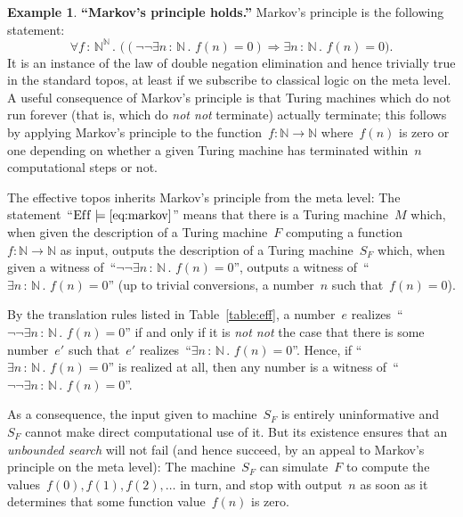 \documentclass[oneside,reqno]{amsart}
\theoremstyle{definition}
\newtheorem{ex}[defn]{Example}
\theoremstyle{plain}
\theoremstyle{remark}
\newcommand{\NN}{\mathbb{N}}
\newcommand{\Eff}{\mathrm{Ef{}f}}
\renewcommand{\_}{\mathpunct{.}\,}
\newcommand{\effective}{ef{}fective\xspace}
\newcommand{\?}{\,{:}\,}
\begin{document}
\begin{ex}\textbf{``Markov's principle holds.''} Markov's principle is the
following statement:
\begin{equation}\label{eq:markov}\tag{MP}
  \forall f \? \NN^\NN\_ \bigl((\neg\neg\exists n\?\NN\_ f(n) = 0)
  \Longrightarrow \exists n\?\NN\_ f(n) = 0\bigr).
\end{equation}
It is an instance of the law of double negation elimination and hence trivially
true in the standard topos, at least if we subscribe to classical logic on the
meta level. A useful consequence of Markov's principle is that Turing machines
which do not run forever (that is, which do \emph{not not} terminate) actually
terminate; this follows by applying Markov's principle to the function~$f : \NN
\to \NN$ where~$f(n)$ is zero or one depending on whether a given Turing
machine has terminated within~$n$ computational steps or not.

The \effective topos inherits Markov's principle from the meta level:
The statement~``$\Eff \models \text{\eqref{eq:markov}}$'' means that there is a
Turing machine~$M$ which, when given the description of a Turing machine~$F$
computing a function~$f : \NN \to \NN$ as input, outputs the description of a Turing
machine~$S_F$ which, when given a witness of~``$\neg\neg \exists n\?\NN\_ f(n)
= 0$'', outputs a witness of~``$\exists n\?\NN\_ f(n) = 0$'' (up to trivial
conversions, a number~$n$ such that~$f(n) = 0$).

By the translation rules listed in Table~\ref{table:eff}, a number~$e$
realizes~``$\neg\neg \exists n\?\NN\_ f(n) = 0$'' if and only if it is
\emph{not not} the case that there is some number~$e'$ such that~$e'$
realizes~``$\exists n\?\NN\_ f(n) = 0$''. Hence, if ``$\exists n\?\NN\_ f(n) =
0$'' is realized at all, then any number is a witness of~``$\neg\neg
\exists n\?\NN\_ f(n) = 0$''.

As a consequence, the input given to machine~$S_F$ is entirely uninformative
and~$S_F$ cannot make direct computational use of it. But its existence ensures that an
\emph{unbounded search} will not fail (and hence succeed, by an appeal to Markov's
principle on the meta level): The machine~$S_F$ can simulate~$F$ to
compute the values~$f(0), f(1), f(2), \ldots$ in turn, and stop
with output~$n$ as soon as it determines that some function value~$f(n)$ is zero.
\end{ex}
\end{document}
